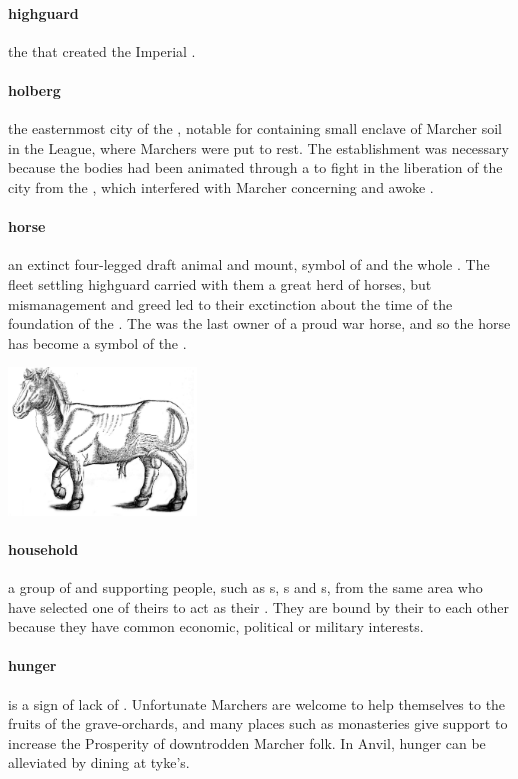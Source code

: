 \paragraph{highguard} the  that created the Imperial .
\paragraph{holberg} the easternmost city of the , notable for containing small enclave of Marcher soil in the League, where Marchers were put to rest. The establishment was necessary because the bodies had been animated through a   to fight in the liberation of the city from the , which interfered with Marcher  concerning  and awoke .
\paragraph{horse} an extinct four-legged draft animal and mount, symbol of  and the whole . The fleet settling highguard carried with them a great herd of horses, but mismanagement and greed led to their exctinction about the time of the foundation of the . The  was the last owner of a proud war horse, and so the horse has become a symbol of the .\begin{center}\includegraphics[width=5cm]{encyclopedia/Horse}\end{center}
\paragraph{household} a group of  and supporting people, such as s, s and s, from the same area who have selected one of theirs to act as their . They are bound by their  to each other because they have common economic, political or military interests.
\paragraph{hunger} is a sign of lack of . Unfortunate Marchers are welcome to help themselves to the fruits of the grave-orchards, and many places such as monasteries give support to increase the Prosperity of downtrodden Marcher folk. In Anvil, hunger can be alleviated by dining at tyke’s.
